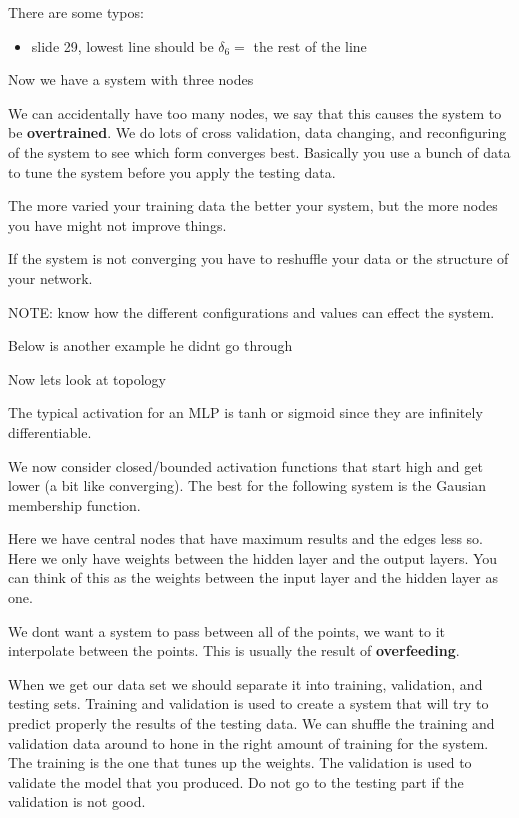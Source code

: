 \documentclass{article}
\begin{document}
There are some typos:
\begin{itemize}
	\item slide 29, lowest line should be $\delta_6 = $ the rest of the line
\end{itemize}





Now we have a system with three nodes

We can accidentally have too many nodes, we say that this causes the system to be \textbf{overtrained}. We do lots of cross validation, data changing, and reconfiguring of the system to see which form converges best. Basically you use a bunch of data to tune the system before you apply the testing data.

The more varied your training data the better your system, but the more nodes you have might not improve things.



If the system is not converging you have to reshuffle your data or the structure of your network.

NOTE: know how the different configurations and values can effect the system.

Below is another example he didnt go through


Now lets look at topology

The typical activation for an MLP is tanh or sigmoid since they are infinitely differentiable.

We now consider closed/bounded activation functions that start high and get lower (a bit like converging). The best for the following system is the Gausian membership function.


Here we have central nodes that have maximum results and the edges less so. Here we only have weights between the hidden layer and the output layers. You can think of this as the weights between the input layer and the hidden layer as one.

We dont want a system to pass between all of the points, we want to it interpolate between the points. This is usually the result of \textbf{overfeeding}.

When we get our data set we should separate it into training, validation, and testing sets. Training and validation is used to create a system that will try to predict properly the results of the testing data. We can shuffle the training and validation data around to hone in the right amount of training for the system. The training is the one that tunes up the weights. The validation is used to validate the model that you produced. Do not go to the testing part if the validation is not good.
\end{document}

